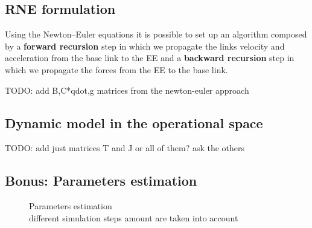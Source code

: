 \documentclass{article}
\begin{document}
\subsection{RNE formulation}
Using the Newton–Euler equations it is possible to set up an algorithm composed by a \textbf{forward recursion} step in which we propagate the links velocity and acceleration from the base link to the EE and a \textbf{backward recursion} step in which we propagate the forces from the EE to the base link.

TODO: add B,C*qdot,g matrices from the newton-euler approach

\subsection{Dynamic model in the operational space}

TODO: add just matrices T and J or all of them? ask the others

\subsection{Bonus: Parameters estimation}

\noindent
\begin{figure}[H]
    \captionsetup{justification=centering}
    \noindent{}
    \caption{Parameters estimation \\ different simulation steps amount are taken into account}
    \label{fig:param_estim}
\end{figure}
\end{document}
